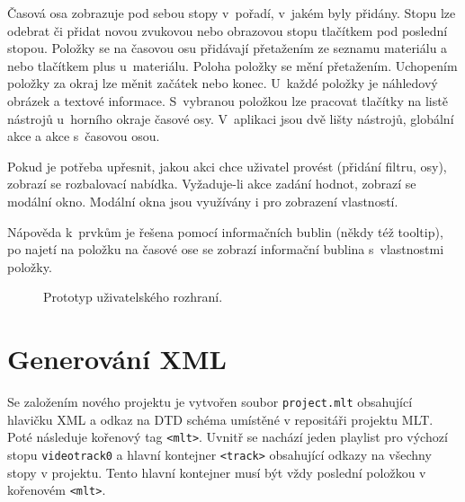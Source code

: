 Časová osa zobrazuje pod sebou stopy v~pořadí, v~jakém byly přidány. Stopu lze odebrat či přidat novou zvukovou nebo obrazovou stopu tlačítkem pod poslední stopou. Položky se na časovou osu přidávají přetažením ze seznamu materiálu a nebo tlačítkem plus u~materiálu. Poloha položky se mění přetažením. Uchopením položky za okraj lze měnit začátek nebo konec. U~každé položky je náhledový obrázek a textové informace. S~vybranou položkou lze pracovat tlačítky na listě nástrojů u~horního okraje časové osy. V~aplikaci jsou dvě lišty nástrojů, globální akce a akce s~časovou osou. 

Pokud je potřeba upřesnit, jakou akci chce uživatel provést (přidání filtru, osy), zobrazí se rozbalovací nabídka. Vyžaduje-li akce zadání hodnot, zobrazí se modální okno. Modální okna jsou využívány i pro zobrazení vlastností.

Nápověda k~prvkům je řešena pomocí informačních bublin (někdy též tooltip), po najetí na položku na časové ose se zobrazí informační bublina s~vlastnostmi položky.

\begin{figure}[h]
	\centering
	\caption{Prototyp uživatelského rozhraní.}\label{img:mockup}
\end{figure}
\section{Generování XML}
Se založením nového projektu je vytvořen soubor \texttt{project.mlt} obsahující hlavičku XML a odkaz na DTD schéma umístěné v repositáři projektu MLT. Poté následuje kořenový tag \texttt{<mlt>}. Uvnitř se nachází jeden playlist pro výchozí stopu \texttt{videotrack0} a hlavní kontejner \texttt{<track>} obsahující odkazy na všechny stopy v projektu. Tento hlavní kontejner musí být vždy poslední položkou v kořenovém \texttt{<mlt>}.

